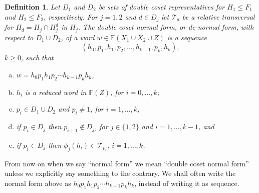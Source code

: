 \documentclass[a4paper,12pt]{article}
\newtheorem{definition}[theorem]{Definition}
\numberwithin{equation}{section}
\numberwithin{figure}{section}
\newcommand{\FF}{\ensuremath{\mathbb{F}}}
\newcommand{\cT}{\mathcal{T}}
\newcommand{\be}{\begin{enumerate}}
\newcommand{\ee}{\end{enumerate}}
\begin{document}
\begin{definition}\label{def:dcnf}
 Let $D_1$ and $D_2$ be sets of  double coset representatives for
$H_1\le F_1$ and $H_2\le F_2$, respectively. For $j=1,2$ and $d\in D_j$ let 
$\cT_d$ be a relative transversal for $H_d=H_j\cap H_j^d$ in $H_j$. 
The \emph{double coset normal form}, or \emph{dc-normal form, with
respect to} $D_1\cup D_2$, of a 
 word $w\in \FF(X_1\cup X_2\cup Z)$ is a sequence 
\[(h_{0},p_1,h_{1},p_2, \ldots, h_{k-1},p_k,h_{{k}}),\] $k\ge 0$,
such that  
\be[(a)]
\item $w = h_{0}p_1h_{1}p_2 \cdots h_{k-1}p_kh_{{k}}$, 
\item $h_i$ is a reduced word in $\FF(Z)$, for $i=0,\ldots, k$;
\item  $p_i  \in D_1\cup D_2$ and $p_i\neq 1$, for $i=1,\ldots, k$,  
\item if  $p_i\in D_j$ then $p_{i+1}\notin D_j$, for $j\in \{1,2\}$
and $i=1,\ldots ,k-1$, and 
\item if $p_i\in D_j$ then $\phi_j(h_i)\in \cT_{p_i}$, $i=1,\ldots ,k$.
\ee
\end{definition}
From now on when we say ``normal form'' we mean ``double coset normal form'' unless
we explicitly say something to the contrary.
 We shall often write the normal form above as 
$h_{0}p_1h_{1}p_2 \cdots h_{k-1}p_kh_{{k}}$, instead of writing it as 
sequence. 
\end{document}

